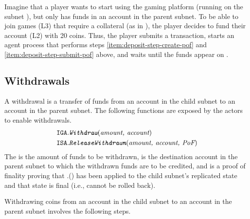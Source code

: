 \begin{example}
\label{ex:deposit}

Imagine that a player wants to start using the gaming platform (running on the subnet ), but only has funds in an account  in the parent subnet.
To be able to join games (L3) that require a collateral (as in ), the player decides to fund their account  (L2) with 20 coins.
Thus, the player submits a  transaction, starts an \ipc agent process that performs steps \ref{item:deposit-step-create-pof} and \ref{item:deposit-step-submit-pof} above,
and waits until the funds appear on .
\end{example}

\subsection{Withdrawals}
\label{sec:withdraw}

A withdrawal is a transfer of funds from an account in the child subnet to an account in the parent subnet.
The following functions are exposed by the \ipc actors to enable withdrawals.
\begin{align*}
    \texttt{IGA}.&\textit{\texttt{Withdraw}}(\textit{amount, account})\\
    \texttt{ISA}.&\textit{\texttt{ReleaseWithdrawn}}(\textit{amount, account, \textit{PoF}})
\end{align*}
The  is the amount of funds to be withdrawn,  is the destination account in the parent subnet to which the withdrawn funds are to be credited, and \funcParam{\pof} is a proof of finality proving that \gw.() has been applied to the child subnet's replicated state and that state is final (i.e., cannot be rolled back).

Withdrawing  coins from an account  in the child subnet  to an account  in the parent subnet 
involves the following steps.

